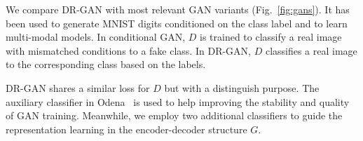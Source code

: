 \documentclass[10pt,journal,compsoc]{IEEEtran}
\begin{document}
\label{sec:gans}
We compare DR-GAN with most relevant GAN variants (Fig.~\ref{fig:gans}).
It has been used to generate MNIST digits conditioned on the class label and to learn multi-modal models. 
In conditional GAN, $D$ is trained to classify a real image with mismatched conditions to a fake class. 
In DR-GAN, $D$ classifies a real image to the corresponding class based on the labels. 

DR-GAN shares a similar loss for $D$ but with a distinguish purpose. The auxiliary classifier in Odena\etal~\cite{odena2017conditional} is used to help improving the stability and quality of GAN training. Meanwhile, we employ two additional classifiers to guide the representation learning in the encoder-decoder structure $G$.
\end{document}
